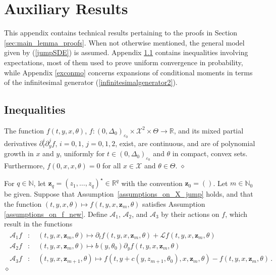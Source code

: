 \documentclass[11pt,a4paper]{article}
\newcommand{\thetan}{{\theta_0}}
\newcommand{\RR}{{\mathbb R}}
\newcommand{\NN}{{\mathbb N}}
\newcommand{\aaa}{{\mathcal{A}}}
\renewcommand{\ll}{{\mathcal{L}}}
\newcommand{\xx}{{\mathcal{X}}}
\newcommand{\dqed}{{\leavevmode \unskip \penalty9999 \hbox{} \nobreak \hfill \quad \hbox{$\diamond$}}}
\numberwithin{equation}{section}
\numberwithin{theorem}{section}
\begin{document}
\appendix

\section{Auxiliary Results}\label{app_lemmas}
This appendix contains technical results pertaining
to the proofs in Section
\ref{sec:main_lemma_proofs}. When not otherwise
mentioned, the general model given by (\ref{jumpSDE}) is assumed.
Appendix \ref{sec:jump:tech:exp} contains inequalities involving expectations, most of them used to prove uniform convergence
in probability, while Appendix \ref{exconmo} concerns expansions
of conditional moments in terms of the infinitesimal generator (\ref{infinitesimalgenerator2}).

\subsection{Inequalities}\label{sec:jump:tech:exp}
%
\begin{assumption}
The
function $f(t,y,x,\theta)$, $f: (0,\Delta_0)_{\varepsilon_0} \times \xx^2 \times
    \Theta \to \RR$, and its mixed partial derivatives $\partial_t^i
    \partial_y^j f$, $i=0,1$, $j=0,1,2$, exist, are
    continuous, and
  are of polynomial growth in $x$ and $y$, uniformly for $t \in
  (0,\Delta_0)_{\varepsilon_0}$ and $\theta$ in compact, convex sets. Furthermore, $f(0,x,x,\theta)=0$ for all $x\in\xx$ and $\theta\in\Theta$.
\dqed
\label{assumptions_on_f_new}
\end{assumption}
%
\begin{definition}
 For $q\in \NN$, let $\mathbf{z}_q=(z_1,\ldots,z_q)^\star  \in
\RR^q$ with the convention $\mathbf{z}_0=()$. Let
$m\in\NN_0$ be given. Suppose that Assumption~\ref{assumptions_on_X_jump} holds, and that the function $(t,y,x,\theta) \mapsto f(t,y,x, \mathbf{z}_m,\theta)$
satisfies Assumption
\ref{assumptions_on_f_new}. Define $\aaa_1$, $\aaa_2$, and $\aaa_3$ by their actions on
$f$, which
result in the functions
\begin{align*}
\begin{split}
\aaa_1  f&:\quad (t,y,x, \mathbf{z}_m,\theta)  \mapsto \partial_t
f(t,y,x, \mathbf{z}_m, \theta) + \ll f(t,y,x, \mathbf{z}_m, \theta)\\
\aaa_2 f&: \quad(t,y,x, \mathbf{z}_m,\theta) \mapsto b(y, \thetan) \partial_y f(t,y,x, \mathbf{z}_m, \theta)\\
\aaa_3 f&:\quad (t,y,x,
\mathbf{z}_{m+1},\theta) \mapsto f(t,y+c(y,z_{m+1}, \thetan), x, \mathbf{z}_m, \theta) - f(t,y,x, \mathbf{z}_m, \theta)\,.
\end{split}
\end{align*}
\dqed
\end{definition}
\end{document}
